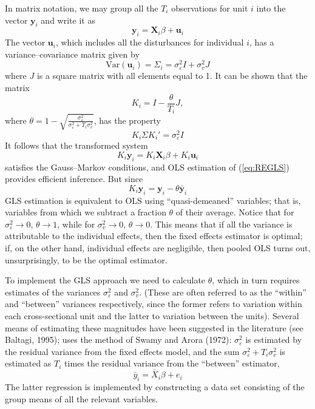 In matrix notation, we may group all the $T_i$ observations for unit
$i$ into the vector $\mathbf{y}_i$ and write it as
\begin{equation}
\label{eq:REvec}
\mathbf{y}_{i} = \mathbf{X}_{i} \beta + \mathbf{u}_i
\end{equation}
The vector $\mathbf{u}_i$, which includes all the disturbances for
individual $i$, has a variance--covariance matrix given by
\begin{equation}
\label{eq:CovMatUnitI}
  \mbox{Var}(\mathbf{u}_i) = \Sigma_i = \sigma^2_{\varepsilon} I + \sigma^2_{v} J
\end{equation}
where $J$ is a square matrix with all elements equal to 1. It can be
shown that the matrix
\[
  K_i = I - \frac{\theta}{T_i} J,
\]
where $\theta = 1 -
\sqrt{\frac{\sigma^2_{\varepsilon}}{\sigma^2_{\varepsilon} + T_i
    \sigma^2_{v}}}$, has the property
\[
  K_i \Sigma K_i' = \sigma^2_{\varepsilon} I
\]
It follows that the transformed system
\begin{equation}
\label{eq:REGLS}
K_i \mathbf{y}_{i} = K_i \mathbf{X}_{i} \beta + K_i \mathbf{u}_i
\end{equation}
satisfies the Gauss--Markov conditions, and OLS estimation of
(\ref{eq:REGLS}) provides efficient inference. But since 
\[
  K_i \mathbf{y}_{i} = \mathbf{y}_{i} - \theta \bar{\mathbf{y}}_{i}
\]
GLS estimation is equivalent to OLS using ``quasi-demeaned''
variables; that is, variables from which we subtract a fraction
$\theta$ of their average. Notice that for $\sigma^2_{\varepsilon} \to
0$, $\theta \to 1$, while for $\sigma^2_{v} \to 0$, $\theta \to 0$.
This means that if all the variance is attributable to the individual
effects, then the fixed effects estimator is optimal; if, on the other
hand, individual effects are negligible, then pooled OLS turns out,
unsurprisingly, to be the optimal estimator.

To implement the GLS approach we need to calculate $\theta$, which in
turn requires estimates of the variances $\sigma^2_{\varepsilon}$ and
$\sigma^2_v$.  (These are often referred to as the ``within'' and
``between'' variances respectively, since the former refers to
variation within each cross-sectional unit and the latter to variation
between the units).  Several means of estimating these magnitudes have
been suggested in the literature (see Baltagi, 1995);  uses
the method of Swamy and Arora (1972): $\sigma^2_\varepsilon$ is
estimated by the residual variance from the fixed effects model, and
the sum $\sigma^2_\varepsilon + T_i \sigma^2_v$ is estimated as $T_i$
times the residual variance from the ``between'' estimator,
\[
\bar{y}_i = \bar{X}_i \beta + e_i
\]
The latter regression is implemented by constructing a data set
consisting of the group means of all the relevant variables.


